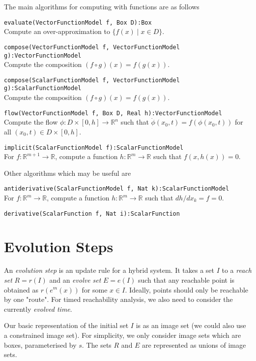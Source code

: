 \documentclass[english,a4paper]{article}
\newcommand{\R}{\mathbb{R}}
\theoremstyle{theorem}
\theoremstyle{definition}
\theoremstyle{remark}
\begin{document}
The main algorithms for computing with functions are as follows
\begin{description}
\item \texttt{evaluate(VectorFunctionModel f, Box D):Box}\\ Compute an over-approximation to $\{ f(x) \mid x\in D\}$.
\item \texttt{compose(VectorFunctionModel f, VectorFunctionModel g):VectorFunctionModel}\\ Compute the composition $(f\circ g)(x)=f(g(x))$.
\item \texttt{compose(ScalarFunctionModel f, VectorFunctionModel g):ScalarFunctionModel}\\ Compute the composition $(f\circ g)(x)=f(g(x))$.
\item \texttt{flow(VectorFunctionModel f, Box D, Real h):VectorFunctionModel}\\ Compute the flow $\phi:D\times[0,h]\rightarrow \R^n$ such that $\dot{\phi}(x_0,t)=f(\phi(x_0,t))$ for all $(x_0,t)\in D\times[0,h]$.
\item \texttt{implicit(ScalarFunctionModel f):ScalarFunctionModel}\\ For $f:\R^{m+1}\rightarrow\R$, compute a function $h:\R^{m}\rightarrow\R$ such that $f(x,h(x))=0$.
\end{description}
Other algorithms which may be useful are
\begin{description}
\item \texttt{antiderivative(ScalarFunctionModel f, Nat k):ScalarFunctionModel}\\ For $f:\R^{m}\rightarrow\R$, compute a function $h:\R^{m}\rightarrow\R$ such that $dh/dx_k=f=0$.
\item \texttt{derivative(ScalarFunction f, Nat i):ScalarFunction}
\end{description}

\section{Evolution Steps}

An \emph{evolution step} is an update rule for a hybrid system. It takes a set $I$ to a \emph{reach set} $R=r(I)$ and an \emph{evolve set} $E=e(I)$ such that any reachable point is obtained as $r(e^m(x))$ for some $x\in I$. Ideally, points should only be reachable by one "route". For timed reachability analysis, we also need to consider the currently \emph{evolved time}.

Our basic representation of the initial set $I$ is as an image set (we could also use a constrained image set). For simplicity, we only consider image sets which are boxes, parameterised by $s$. The sets $R$ and $E$ are represented as unions of image sets.
\end{document}
